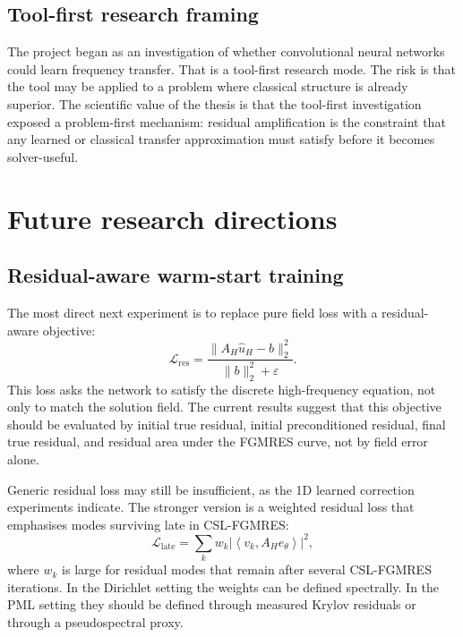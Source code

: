 \subsection{Tool-first research framing}
\label{subsec:discussion-limit-tool-first}

The project began as an investigation of whether convolutional neural networks
could learn frequency transfer. That is a tool-first research mode. The risk
is that the tool may be applied to a problem where classical structure is
already superior. The scientific value of the thesis is that the tool-first
investigation exposed a problem-first mechanism: residual amplification is the
constraint that any learned or classical transfer approximation must satisfy
before it becomes solver-useful.

\section{Future research directions}
\label{sec:discussion-future}

\subsection{Residual-aware warm-start training}
\label{subsec:discussion-future-residual}

The most direct next experiment is to replace pure field loss with a
residual-aware objective:
\begin{equation}
    \mathcal{L}_{\mathrm{res}}
    =
    \frac{\|A_H \hat{u}_H - b\|_2^2}{\|b\|_2^2+\varepsilon}.
    \label{eq:discussion-residual-loss}
\end{equation}
This loss asks the network to satisfy the discrete high-frequency equation,
not only to match the solution field. The current results suggest that this
objective should be evaluated by initial true residual, initial
preconditioned residual, final true residual, and residual area under the
FGMRES curve, not by field error alone.

Generic residual loss may still be insufficient, as the 1D learned correction
experiments indicate. The stronger version is a weighted residual loss that
emphasises modes surviving late in CSL-FGMRES:
\begin{equation}
    \mathcal{L}_{\mathrm{late}}
    =
    \sum_k w_k
    \left|
    \left\langle v_k, A_H e_\theta \right\rangle
    \right|^2,
    \label{eq:discussion-late-mode-loss}
\end{equation}
where $w_k$ is large for residual modes that remain after several CSL-FGMRES
iterations. In the Dirichlet setting the weights can be defined spectrally. In
the PML setting they should be defined through measured Krylov residuals or
through a pseudospectral proxy.

